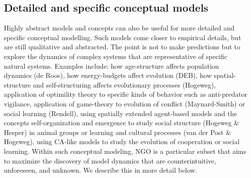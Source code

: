\subsection{Detailed and specific conceptual models}

Highly abstract models and concepts can also be useful for more detailed and specific conceptual modelling. Such models come closer to empirical details, but are still qualitative and abstracted. The point is not to make predictions but to explore the dynamics of complex systems that are representative of specific natural systems. Examples include: how age-structure affects population dynamics (de Roos), how energy-budgets affect evolution (DEB), how spatial-structure and self-structuring affects evolutionary processes (Hogeweg), application of optimility theory to specific kinds of behavior such as anti-predator vigilance, application of game-theory to evolution of conflict (Maynard-Smith) or social learning (Rendell), using spatially extended agent-based models and the concepts self-organization and emergence to study social structure (Hogeweg & Hesper) in animal groups or learning and cultural processes (van der Post & Hogeweg), using CA-like models to study the evolution of cooperation or social learning.
Within such conceptual modeling, NGO is a particular subset that aims to maximize the discovery of model dynamics that are counterintuitive, unforeseen, and unknown. We describe this in more detail below.
  